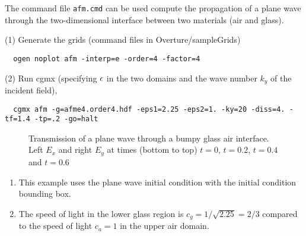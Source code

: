 The command file {\tt afm.cmd} can be used compute the propagation of a plane wave through the 
two-dimensional interface between two materials (air and glass).

\noindent (1) Generate the grids (command files in Overture/sampleGrids)
{\small
\begin{verbatim}
  ogen noplot afm -interp=e -order=4 -factor=4
\end{verbatim}
}
\noindent (2) Run cgmx (specifying $\epsilon$ in the two domains and the wave number $k_y$ of the incident field), 
{\small
\begin{verbatim}
  cgmx afm -g=afme4.order4.hdf -eps1=2.25 -eps2=1. -ky=20 -diss=4. -tf=1.4 -tp=.2 -go=halt
\end{verbatim}
}
{
\begin{figure}[hbt]
\newcommand{\figWidth}{7.0cm}
\newcommand{\trimfig}[2]{\trimFig{#1}{#2}{0.25}{0.25}{.45}{.425}}
\begin{center}
\end{center}
\caption{Transmission of a plane wave through a bumpy glass air interface. Left $E_x$ and right $E_y$ at times (bottom to top) 
  $t=0$, $t=0.2$, $t=0.4$ and $t=0.6$}
\label{fig:scatBump2d}
\end{figure}
}

\begin{enumerate}
  \item This example uses the plane wave initial condition with the initial condition bounding box.
  \item The speed of light in the lower glass region is $c_g =1/\sqrt{2.25} = 2/3$ compared to the speed of light $c_a=1$ in the
      upper air domain. 
\end{enumerate}

